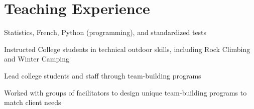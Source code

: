\documentclass[letterpaper]{deedy-resume} %
\begin{document}
\begin{minipage}[t]{0.66\textwidth} %


\section{Teaching Experience}


\vspace{\topsep} %
\vspace{\topsep} %
\begin{tightitemize}
\item Statistics, French, Python (programming), and standardized tests
\end{tightitemize}

\sectionspace %


\vspace{\topsep} %
\vspace{\topsep} %
\begin{tightitemize}
\item Instructed College students in technical outdoor skills, including Rock Climbing and Winter Camping
\end{tightitemize}

\sectionspace %

\vspace{\topsep} %
\begin{tightitemize}
\item Lead college students and staff through team-building programs
\item Worked with groups of facilitators to design unique team-building programs to match client needs
\end{tightitemize}

\sectionspace %


\end{minipage}
\end{document}

